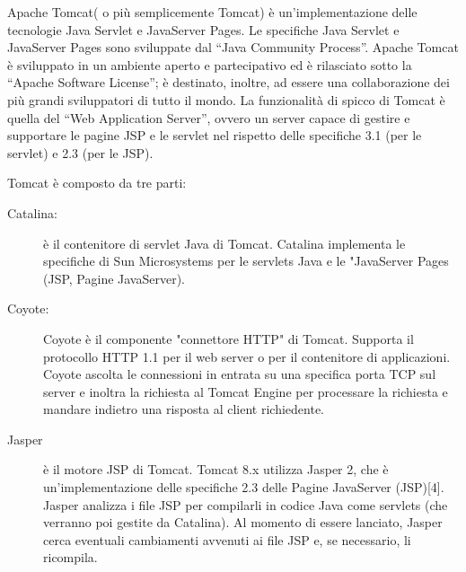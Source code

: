 Apache  Tomcat( o più semplicemente Tomcat) è  un’implementazione  delle  tecnologie  Java  Servlet  e  JavaServer  Pages. Le  specifiche  Java  Servlet  e  JavaServer  Pages  sono sviluppate  dal  “Java  Community Process”. Apache Tomcat è sviluppato in un ambiente aperto e partecipativo ed è rilasciato sotto  la  “Apache  Software  License”;  è destinato, inoltre,  ad  essere  una  collaborazione  dei più grandi sviluppatori di tutto il mondo. La  funzionalità  di  spicco  di  Tomcat  è  quella  del  “Web  Application  Server”,  ovvero  un server capace di gestire e supportare le pagine JSP e le servlet nel rispetto delle specifiche 3.1  (per  le  servlet)  e  2.3  (per  le  JSP). 

Tomcat è composto da tre parti:
\begin{description}
\item[Catalina:]è il contenitore di servlet Java di Tomcat. Catalina implementa le specifiche di Sun Microsystems per le servlets Java e le "JavaServer Pages (JSP, Pagine JavaServer).
\item[Coyote:]Coyote è il componente "connettore HTTP" di Tomcat. Supporta il protocollo HTTP 1.1 per il web server o per il contenitore di applicazioni. Coyote ascolta le connessioni in entrata su una specifica porta TCP sul server e inoltra la richiesta al Tomcat Engine per processare la richiesta e mandare indietro una risposta al client richiedente.
\item[Jasper]è il motore JSP di Tomcat. Tomcat 8.x utilizza Jasper 2, che è un'implementazione delle specifiche 2.3 delle Pagine JavaServer (JSP)[4]. Jasper analizza i file JSP per compilarli in codice Java come servlets (che verranno poi gestite da Catalina). Al momento di essere lanciato, Jasper cerca eventuali cambiamenti avvenuti ai file JSP e, se necessario, li ricompila.
\end{description}